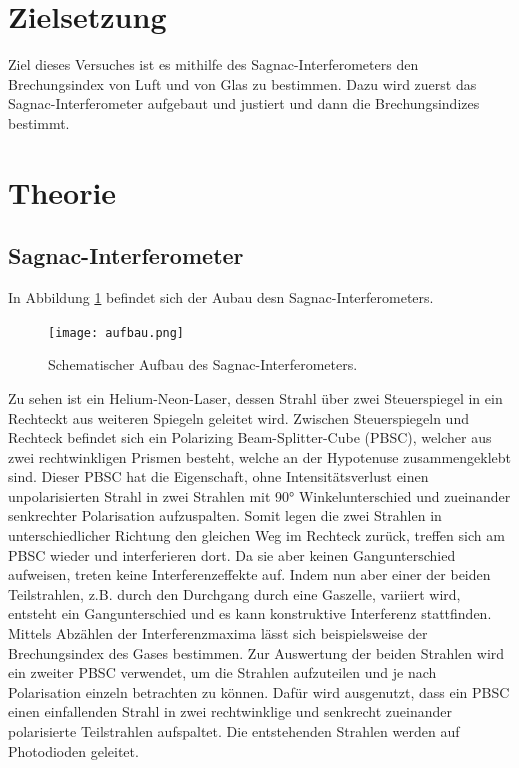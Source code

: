 \maketitle
\setcounter{page}{1}
\newpage
{}
\section{Zielsetzung}
Ziel dieses Versuches ist es mithilfe des Sagnac-Interferometers den Brechungsindex
von Luft und von Glas zu bestimmen. Dazu wird zuerst das Sagnac-Interferometer
aufgebaut und justiert und dann die Brechungsindizes bestimmt.

\section{Theorie}
\subsection{Sagnac-Interferometer}
\label{sec:lol}
In Abbildung \ref{fig:1} befindet sich der Aubau desn Sagnac-Interferometers.
\begin{figure}
  \centering
  \texttt{[image: aufbau.png]}
  \caption{Schematischer Aufbau des Sagnac-Interferometers. \cite{anleitung}}
  \label{fig:1}
\end{figure}
Zu sehen ist ein Helium-Neon-Laser, dessen Strahl über zwei Steuerspiegel in
ein Rechteckt aus weiteren Spiegeln geleitet wird. Zwischen Steuerspiegeln und
Rechteck befindet sich ein Polarizing Beam-Splitter-Cube (PBSC), welcher aus zwei
rechtwinkligen Prismen besteht, welche an der Hypotenuse zusammengeklebt sind. Dieser PBSC
hat die Eigenschaft, ohne Intensitätsverlust einen unpolarisierten Strahl in
zwei Strahlen mit 90° Winkelunterschied und zueinander senkrechter Polarisation
aufzuspalten. Somit legen die zwei Strahlen in unterschiedlicher Richtung den gleichen Weg
im Rechteck zurück, treffen sich am \mbox{PBSC} wieder und interferieren dort. Da sie aber
keinen Gangunterschied aufweisen, treten keine Interferenzeffekte
auf. Indem nun aber einer der beiden Teilstrahlen, z.B. durch den Durchgang durch
eine Gaszelle, variiert wird, entsteht ein Gangunterschied und es kann konstruktive Interferenz stattfinden.
Mittels Abzählen der Interferenzmaxima lässt sich beispielsweise der Brechungsindex des Gases
bestimmen. Zur Auswertung der beiden Strahlen wird ein zweiter PBSC
verwendet, um die Strahlen aufzuteilen und je nach Polarisation einzeln betrachten
zu können. Dafür wird ausgenutzt, dass ein PBSC einen einfallenden Strahl in zwei
rechtwinklige und senkrecht zueinander polarisierte Teilstrahlen aufspaltet.
Die entstehenden Strahlen werden auf Photodioden geleitet.

